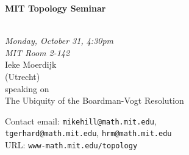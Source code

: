 \documentclass{slides}
\begin{document}
\begin{center}

{\fontsize {54pt}{40pt}\selectfont

\textrm{
{\textbf{MIT Topology Seminar}}}
}\\
\vspace{1cm}
{\large\textrm{\emph{Monday, October 31, 4:30pm\\MIT Room 2-142}}}\\
\vspace{1cm}
\textrm{{\LARGE Ieke Moerdijk  \\[.5cm](Utrecht)}}\\
\vspace{1cm} %
\textrm{speaking on}\\ %
\vspace{5mm}
\textrm{{\LARGE The Ubiquity of the Boardman-Vogt Resolution}}\\
\end{center}
\vspace{1cm}
{\tiny

\textrm{Contact email: } \texttt{mikehill@math.mit.edu},\\
 \texttt{tgerhard@math.mit.edu},
\texttt{hrm@math.mit.edu}\\
\textrm{URL: } \texttt{www-math.mit.edu/topology}
}
\end{document}
